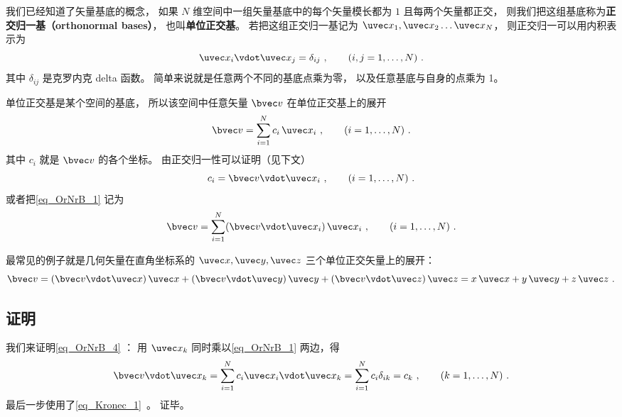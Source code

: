 

我们已经知道了矢量基底的概念， 如果 $N$ 维空间中一组矢量基底中的每个矢量模长都为 $1$ 且每两个矢量都正交， 则我们把这组基底称为\textbf{正交归一基（orthonormal bases）}， 也叫\textbf{单位正交基}。 若把这组正交归一基记为 $\uvec x_1,\uvec x_2\dots\uvec x_N$， 则正交归一可以用内积表示为
\begin{equation}\label{eq_OrNrB_3}
\uvec x_i \vdot \uvec x_j = \delta_{ij} ~,\qquad (i,j = 1,\dots, N)~.
\end{equation}
其中 $\delta_{ij}$ 是克罗内克 delta 函数。 简单来说就是任意两个不同的基底点乘为零， 以及任意基底与自身的点乘为 1。

单位正交基是某个空间的基底， 所以该空间中任意矢量 $\bvec v$ 在单位正交基上的展开
\begin{equation}\label{eq_OrNrB_1}
\bvec v = \sum_{i = 1}^N c_i \,\uvec x_i ~,\qquad (i = 1,\dots, N)~.
\end{equation}
其中 $c_i$ 就是 $\bvec v$ 的各个坐标。 由正交归一性可以证明（见下文）
\begin{equation}\label{eq_OrNrB_4}
c_i = \bvec v\vdot\uvec x_i ~,\qquad (i = 1,\dots, N)~.
\end{equation}
或者把\autoref{eq_OrNrB_1} 记为
\begin{equation}\label{eq_OrNrB_5}
\bvec v = \sum_{i = 1}^N (\bvec v\vdot\uvec x_i) \,\uvec x_i~, \qquad (i = 1,\dots, N)~.
\end{equation}

最常见的例子就是几何矢量在直角坐标系的 $\uvec x, \uvec y, \uvec z$ 三个单位正交矢量上的展开：
\begin{equation}
\bvec v = (\bvec v \vdot \uvec x)\,\uvec x + (\bvec v \vdot \uvec y)\,\uvec y + (\bvec v \vdot \uvec z)\,\uvec z = x \,\uvec x + y \,\uvec y + z \,\uvec z~.
\end{equation} 

\subsection{证明}
我们来证明\autoref{eq_OrNrB_4} ： 用 $\uvec x_k$ 同时乘以\autoref{eq_OrNrB_1} 两边，得
\begin{equation}\label{eq_OrNrB_2}
\bvec v \vdot \uvec x_k = \sum_{i = 1}^N  c_i \uvec x_i \vdot\uvec x_k = \sum_{i = 1}^N c_i \delta_{ik}  = c_k ~,\qquad (k = 1, \dots, N)~.
\end{equation}
最后一步使用了\autoref{eq_Kronec_1}~。 证毕。

